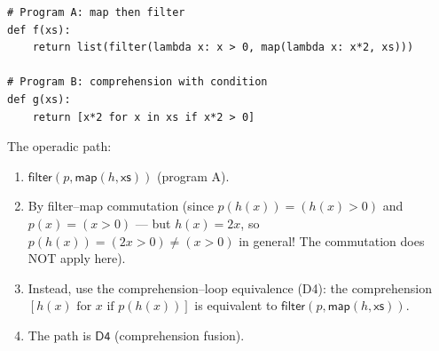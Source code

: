 \begin{example}
\begin{lstlisting}
# Program A: map then filter
def f(xs):
    return list(filter(lambda x: x > 0, map(lambda x: x*2, xs)))

# Program B: comprehension with condition
def g(xs):
    return [x*2 for x in xs if x*2 > 0]
\end{lstlisting}

The operadic path:
\begin{enumerate}
  \item $\mathsf{filter}(p, \mathsf{map}(h, \mathsf{xs}))$
    (program A).
  \item By filter--map commutation (since $p(h(x)) = (h(x) > 0)$
    and $p(x) = (x > 0)$ --- but $h(x) = 2x$, so
    $p(h(x)) = (2x > 0) \neq (x > 0)$ in general!  The commutation
    does NOT apply here).
  \item Instead, use the comprehension--loop equivalence (D4):
    the comprehension $[h(x) \text{ for } x \text{ if } p(h(x))]$
    is equivalent to $\mathsf{filter}(p, \mathsf{map}(h, \mathsf{xs}))$.
  \item The path is $\mathsf{D4}$ (comprehension fusion).
\end{enumerate}
\end{example}


